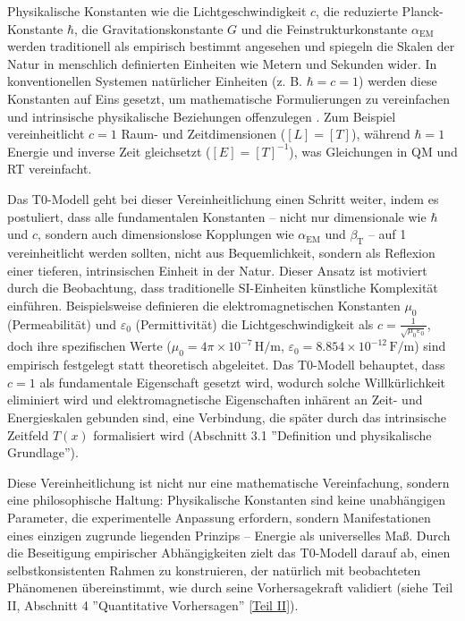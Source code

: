 \documentclass[12pt,a4paper]{article}
\newcommand{\Tfield}{T(x)}
\newcommand{\alphaEM}{\alpha_{\text{EM}}}
\newcommand{\betaT}{\beta_{\text{T}}}
\begin{document}
	Physikalische Konstanten wie die Lichtgeschwindigkeit \(c\), die reduzierte Planck-Konstante \(\hbar\), die Gravitationskonstante \(G\) und die Feinstrukturkonstante \(\alphaEM\) werden traditionell als empirisch bestimmt angesehen und spiegeln die Skalen der Natur in menschlich definierten Einheiten wie Metern und Sekunden wider. In konventionellen Systemen natürlicher Einheiten (z. B. \(\hbar = c = 1\)) werden diese Konstanten auf Eins gesetzt, um mathematische Formulierungen zu vereinfachen und intrinsische physikalische Beziehungen offenzulegen \cite{Planck1899,Duff2002}. Zum Beispiel vereinheitlicht \(c = 1\) Raum- und Zeitdimensionen (\([L] = [T]\)), während \(\hbar = 1\) Energie und inverse Zeit gleichsetzt (\([E] = [T]^{-1}\)), was Gleichungen in QM und RT vereinfacht.
	
	Das T0-Modell geht bei dieser Vereinheitlichung einen Schritt weiter, indem es postuliert, dass alle fundamentalen Konstanten – nicht nur dimensionale wie \(\hbar\) und \(c\), sondern auch dimensionslose Kopplungen wie \(\alphaEM\) und \(\betaT\) – auf 1 vereinheitlicht werden sollten, nicht aus Bequemlichkeit, sondern als Reflexion einer tieferen, intrinsischen Einheit in der Natur. Dieser Ansatz ist motiviert durch die Beobachtung, dass traditionelle SI-Einheiten künstliche Komplexität einführen. Beispielsweise definieren die elektromagnetischen Konstanten \(\mu_0\) (Permeabilität) und \(\varepsilon_0\) (Permittivität) die Lichtgeschwindigkeit als \(c = \frac{1}{\sqrt{\mu_0\varepsilon_0}}\), doch ihre spezifischen Werte (\(\mu_0 = 4\pi \times 10^{-7} \, \text{H/m}\), \(\varepsilon_0 = 8.854 \times 10^{-12} \, \text{F/m}\)) sind empirisch festgelegt statt theoretisch abgeleitet. Das T0-Modell behauptet, dass \(c = 1\) als fundamentale Eigenschaft gesetzt wird, wodurch solche Willkürlichkeit eliminiert wird und elektromagnetische Eigenschaften inhärent an Zeit- und Energieskalen gebunden sind, eine Verbindung, die später durch das intrinsische Zeitfeld \(\Tfield\) formalisiert wird (Abschnitt 3.1 ''Definition und physikalische Grundlage'').
	
	Diese Vereinheitlichung ist nicht nur eine mathematische Vereinfachung, sondern eine philosophische Haltung: Physikalische Konstanten sind keine unabhängigen Parameter, die experimentelle Anpassung erfordern, sondern Manifestationen eines einzigen zugrunde liegenden Prinzips – Energie als universelles Maß. Durch die Beseitigung empirischer Abhängigkeiten zielt das T0-Modell darauf ab, einen selbstkonsistenten Rahmen zu konstruieren, der natürlich mit beobachteten Phänomenen übereinstimmt, wie durch seine Vorhersagekraft validiert (siehe Teil II, Abschnitt 4 ''Quantitative Vorhersagen'' \href{https://github.com/jpascher/T0-Time-Mass-Duality/tree/main/2/pdf/Deutsch/Bridging Quantum Mechanics and Relativity through Time-Mass Duality Part II Theoretical Foundations.pdf}{[Teil II]}).
	
\end{document}
